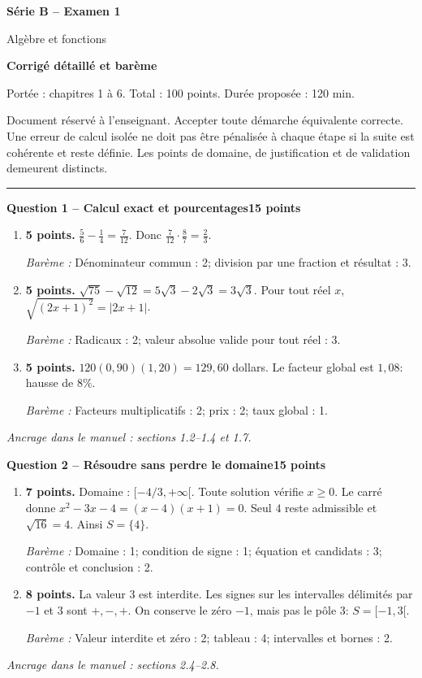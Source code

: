 \documentclass[11pt,a4paper]{article}
\begin{document}
{\LARGE\bfseries Série B -- Examen 1}\par
{\large Algèbre et fonctions}\par
\textbf{Corrigé détaillé et barème}\par
Portée : chapitres 1 à 6. Total : 100 points. Durée proposée : 120 min.\par
\small Document réservé à l’enseignant. Accepter toute démarche équivalente correcte. Une erreur de calcul isolée ne doit pas être pénalisée à chaque étape si la suite est cohérente et reste définie. Les points de domaine, de justification et de validation demeurent distincts.\normalsize\par
\vspace{3mm}\hrule\vspace{4mm}
{\large\bfseries Question 1 -- Calcul exact et pourcentages}\hfill\textbf{15 points}\par
\begin{enumerate}
\item \textbf{5 points.} \(\frac56-\frac14=\frac7{12}\). Donc \(\frac7{12}\cdot\frac87=\frac23\).
\par{\small\textit{Barème : }Dénominateur commun : 2; division par une fraction et résultat : 3.}
\item \textbf{5 points.} \(\sqrt{75}-\sqrt{12}=5\sqrt3-2\sqrt3=3\sqrt3\). Pour tout réel \(x\), \(\sqrt{(2x+1)^2}=|2x+1|\).
\par{\small\textit{Barème : }Radicaux : 2; valeur absolue valide pour tout réel : 3.}
\item \textbf{5 points.} \(120(0{,}90)(1{,}20)=129{,}60\) dollars. Le facteur global est \(1{,}08\): hausse de \(8\%\).
\par{\small\textit{Barème : }Facteurs multiplicatifs : 2; prix : 2; taux global : 1.}
\end{enumerate}
\vfill {\small\textit{Ancrage dans le manuel : sections 1.2--1.4 et 1.7.}}

\newpage
{\large\bfseries Question 2 -- Résoudre sans perdre le domaine}\hfill\textbf{15 points}\par
\begin{enumerate}
\item \textbf{7 points.} Domaine : \([-4/3,+\infty[\). Toute solution vérifie \(x\ge0\). Le carré donne \(x^2-3x-4=(x-4)(x+1)=0\). Seul \(4\) reste admissible et \(\sqrt{16}=4\). Ainsi \(S=\{4\}\).
\par{\small\textit{Barème : }Domaine : 1; condition de signe : 1; équation et candidats : 3; contrôle et conclusion : 2.}
\item \textbf{8 points.} La valeur \(3\) est interdite. Les signes sur les intervalles délimités par \(-1\) et \(3\) sont \(+, -, +\). On conserve le zéro \(-1\), mais pas le pôle \(3\): \(S=[-1,3[\).
\par{\small\textit{Barème : }Valeur interdite et zéro : 2; tableau : 4; intervalles et bornes : 2.}
\end{enumerate}
\vfill {\small\textit{Ancrage dans le manuel : sections 2.4--2.8.}}
\end{document}
